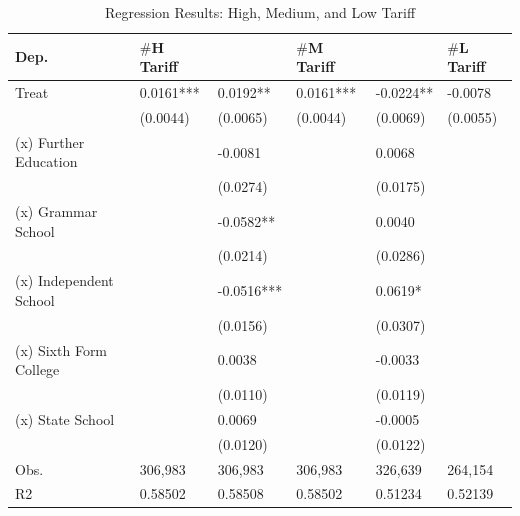 \begin{table}[ht]
\small
\centering
\caption{Regression Results: High, Medium, and Low Tariff}
\label{tab:regression_tariff}
\begin{tabular}{llllll}
\toprule
Dep. & $\#$H Tariff & & $\#$M Tariff & &$\#$L Tariff \\
\midrule
Treat & 0.0161*** & 0.0192** & 0.0161*** & -0.0224** & -0.0078 \\
      & (0.0044) & (0.0065) & (0.0044) & (0.0069) & (0.0055) \\
(x) Further Education &  & -0.0081 &  & 0.0068 &  \\
          &  & (0.0274) &  & (0.0175) &  \\
(x) Grammar School &  & -0.0582** &  & 0.0040 &  \\
          &  & (0.0214) &  & (0.0286) &  \\
(x) Independent School &  & -0.0516*** &  & 0.0619* &  \\
          &  & (0.0156) &  & (0.0307) &  \\
(x) Sixth Form College &  & 0.0038 &  & -0.0033 &  \\
          &  & (0.0110) &  & (0.0119) &  \\
(x) State School &  & 0.0069 &  & -0.0005 &  \\
          &  & (0.0120) &  & (0.0122) &  \\
\midrule
Obs. & 306,983 & 306,983 & 306,983 & 326,639 & 264,154 \\
R2   & 0.58502 & 0.58508 & 0.58502 & 0.51234 & 0.52139 \\
\bottomrule
\end{tabular}
\end{table}
